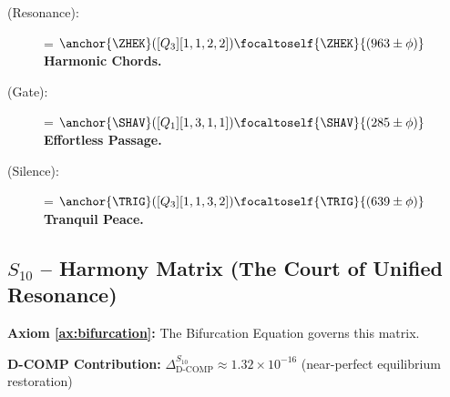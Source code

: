 \begin{description}
    \item[\ZHEK{} (Resonance):] \zhekphaz = $\anchor{\ZHEK}([Q_3][1,1,2,2]) \focaltoself{\ZHEK}{(963 \pm \phi)}$\, \\
    \textbf{Harmonic Chords.}

    \item[\SHAV{} (Gate):] \shavhinge = $\anchor{\SHAV}([Q_1][1,3,1,1]) \focaltoself{\SHAV}{(285 \pm \phi)}$\, \\
    \textbf{Effortless Passage.}

    \item[\TRIG{} (Silence):] \trigetern = $\anchor{\TRIG}([Q_3][1,1,3,2]) \focaltoself{\TRIG}{(639 \pm \phi)}$\, \\
    \textbf{Tranquil Peace.}
\end{description}

\subsection{$S_{10}$ -- Harmony Matrix (The Court of Unified Resonance)}\label{sec:19.4}

\textbf{Axiom \ref{ax:bifurcation}:} The Bifurcation Equation governs this matrix.

\textbf{D-COMP Contribution:} $\Delta_{\text{D-COMP}}^{S_{10}} \approx 1.32 \times 10^{-16}$ (near-perfect equilibrium restoration)

